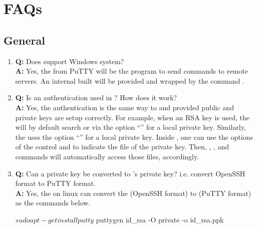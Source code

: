 

\section[FAQs]{FAQs}
\label{sec:faqs}


\subsection[General]{General}
\label{sec:general}

\begin{enumerate}
\item {\bf\color{blue} Q:}
      Does  support Windows system? \\
      {\bf\color{blue} A:}
      Yes, the  from PuTTY will be the program to send
      commands to remote servers. An internal built  will
      be provided and wrapped by the  command .

\item {\bf\color{blue} Q:}
      Is an authentication used in ? How does it work? \\
      {\bf\color{blue} A:}
      Yes, the authentication is the same way to  and
       provided public and private keys are setup correctly.
      For example, when an RSA key is used, the  will by
      default search
       or via the option ``'' for a local
      private key.
      Similarly,
      the  uses the option ``'' for a
      local private key.
      Inside , one can use the options of the control
       and  to
      indicate the file of the private key. Then, , ,
      and  commands will automatically access those files,
      accordingly.

\item {\bf\color{blue} Q:}
      Can a  private key be converted to 's private
      key? i.e. convert OpenSSH format to PuTTY format. \\
      {\bf\color{blue} A:}
      Yes, the  on linux can convert the 
      (OpenSSH format) to  (PuTTY format) as the commands
      below.
\begin{Command}
$ sudo apt-get install putty
$ puttygen id_rsa -O private -o id_rsa.ppk
\end{Command}


\end{enumerate}
